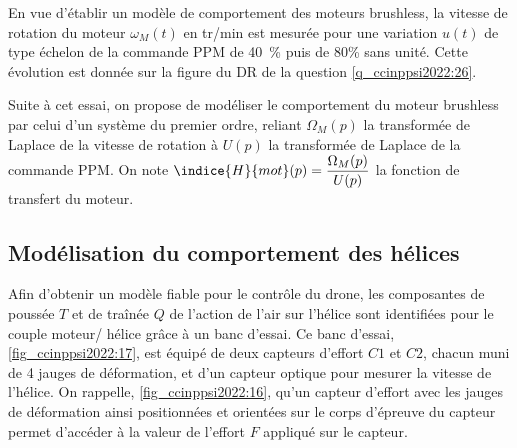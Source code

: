 En vue d’établir un modèle de comportement des moteurs brushless, la vitesse de rotation du
moteur $\omega_M(t)$ en \si{tr/min} est mesurée pour une variation $u(t)$ de type échelon de la commande
PPM de \SI{40}{\%} puis de 80\% sans unité. Cette évolution est donnée sur la figure du DR de la
question \ref{q_ccinppsi2022:26}.

Suite à cet essai, on propose de modéliser le comportement du moteur brushless par celui
d’un système du premier ordre, reliant $\Omega_M(p)$ la transformée de Laplace de la vitesse de rotation à
$U(p)$ la transformée de Laplace de la commande PPM. On note $\indice{H}{mot}(p) = \dfrac{\Omega_M(p)}{
U(p)}$ la fonction de transfert du moteur.

\ifprof
\begin{corrige}
\end{corrige}
\else
\fi

\subsection{Modélisation du comportement des hélices}
Afin d’obtenir un modèle fiable pour le contrôle du drone, les composantes de poussée
$T$ et de traînée $Q$ de l’action de l’air sur l’hélice sont identifiées pour le couple moteur/
hélice grâce à un banc d’essai. Ce banc d’essai, \autoref{fig_ccinppsi2022:17}, est équipé de deux capteurs
d’effort $C1$ et $C2$, chacun muni de 4 jauges de déformation, et d’un capteur optique pour
mesurer la vitesse de l’hélice. On rappelle, \autoref{fig_ccinppsi2022:16}, qu’un capteur d’effort avec les jauges
de déformation ainsi positionnées et orientées sur le corps d’épreuve du capteur permet
d’accéder à la valeur de l’effort $F$ appliqué sur le capteur.


\ifprof
\begin{corrige}
\end{corrige}
\else
\fi

